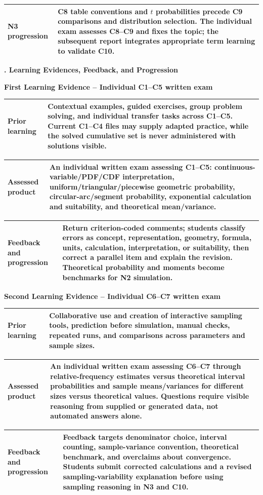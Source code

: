 \documentclass[10pt,letterpaper]{article}
\newcommand{\sectionbar}[1]{%
	\begin{tcolorbox}[
		enhanced,
		colback=sectionblue,
		colframe=sectionblue,
		boxrule=0pt,
		sharp corners,
		left=0.32in,
		right=0.08in,
		top=3.5pt,
		bottom=3.5pt,
		before skip=0pt,
		after skip=0pt,
		borderline north={1.15pt}{0pt}{black},
		borderline south={1.15pt}{0pt}{black}
		]
		\color{white}\bfseries\fontsize{12}{14}\selectfont #1
	\end{tcolorbox}%
}
\newcommand{\plansection}[1]{%
	\Needspace{8\baselineskip}\par\vspace{0.23in}\sectionbar{#1}\vspace{0.20in}%
}
\newcommand{\plansubsection}[1]{%
	\Needspace{7\baselineskip}\par\vspace{6pt}%
	\begin{tcolorbox}[
		colback=sectionblue!13,
		colframe=borderblue,
		boxrule=1.15pt,
		sharp corners,
		left=6pt,right=6pt,top=4pt,bottom=4pt,
		before skip=0pt,after skip=0pt]
		\bfseries #1
	\end{tcolorbox}%
}
\newcommand{\labelled}[2]{%
	\noindent
	\begin{tabularx}{\textwidth}{|>{\RaggedRight\arraybackslash\bfseries}p{2.12in}|>{\RaggedRight\arraybackslash}X|}
		\hline
		#1 & #2\\
		\hline
	\end{tabularx}\par\vspace{-\arrayrulewidth}%
}
\begin{document}
\labelled{N3 progression}{C8 table conventions and $t$ probabilities precede C9 comparisons and distribution selection. The individual exam assesses C8--C9 and fixes the topic; the subsequent report integrates appropriate term learning to validate C10.}

\newpage
\plansection{6. Learning Evidences, Feedback, and Progression}
\plansubsection{First Learning Evidence -- Individual C1--C5 written exam}
\labelled{Prior learning}{Contextual examples, guided exercises, group problem solving, and individual transfer tasks across C1--C5. Current C1--C4 files may supply adapted practice, while the solved cumulative set is never administered with solutions visible.}
\labelled{Assessed product}{An individual written exam assessing C1--C5: continuous-variable/PDF/CDF interpretation, uniform/triangular/piecewise geometric probability, circular-arc/segment probability, exponential calculation and suitability, and theoretical mean/variance.}
\labelled{Feedback and progression}{Return criterion-coded comments; students classify errors as concept, representation, geometry, formula, units, calculation, interpretation, or suitability, then correct a parallel item and explain the revision. Theoretical probability and moments become benchmarks for N2 simulation.}

\plansubsection{Second Learning Evidence -- Individual C6--C7 written exam}
\labelled{Prior learning}{Collaborative use and creation of interactive sampling tools, prediction before simulation, manual checks, repeated runs, and comparisons across parameters and sample sizes.}
\labelled{Assessed product}{An individual written exam assessing C6--C7 through relative-frequency estimates versus theoretical interval probabilities and sample means/variances for different sizes versus theoretical values. Questions require visible reasoning from supplied or generated data, not automated answers alone.}
\labelled{Feedback and progression}{Feedback targets denominator choice, interval counting, sample-variance convention, theoretical benchmark, and overclaims about convergence. Students submit corrected calculations and a revised sampling-variability explanation before using sampling reasoning in N3 and C10.}
\end{document}

